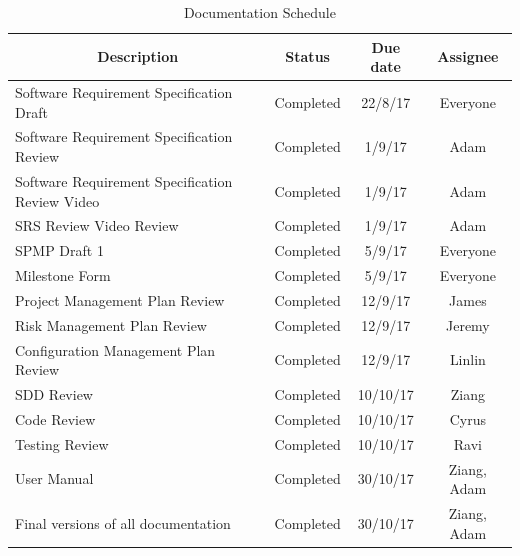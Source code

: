 \documentclass[12pt,a4paper]{article}
\begin{document}
    \begin{table}[h!]
\centering
\caption{Documentation Schedule}
\label{DocumentationTable}
\begin{tabular}{|l|c|c|c|}
\hline
\multicolumn{1}{|c|}{Description}               & Status      & Due date & Assignee \\ \hline
Software Requirement Specification Draft        & Completed   & 22/8/17  & Everyone \\ \hline
Software Requirement Specification Review       & Completed   & 1/9/17   & Adam     \\ \hline
Software Requirement Specification Review Video & Completed   & 1/9/17   & Adam     \\ \hline
SRS Review Video Review                         & Completed   & 1/9/17   & Adam     \\ \hline
SPMP Draft 1                                    & Completed   & 5/9/17   & Everyone \\ \hline
Milestone Form                                  & Completed   & 5/9/17   & Everyone \\ \hline
Project Management Plan Review                  & Completed   & 12/9/17  & James    \\ \hline
Risk Management Plan Review                     & Completed   & 12/9/17  & Jeremy   \\ \hline
Configuration Management Plan Review            & Completed   & 12/9/17  & Linlin   \\ \hline
SDD Review                                      & Completed   & 10/10/17 & Ziang    \\ \hline
Code Review                                     & Completed   & 10/10/17 & Cyrus    \\ \hline
Testing Review                                  & Completed   & 10/10/17 & Ravi     \\ \hline
User Manual                                  & Completed   & 30/10/17 & Ziang, Adam     \\ \hline
Final versions of all documentation                                  & Completed   & 30/10/17 & Ziang, Adam     \\ \hline
\end{tabular}
\end{table}
\end{document}
